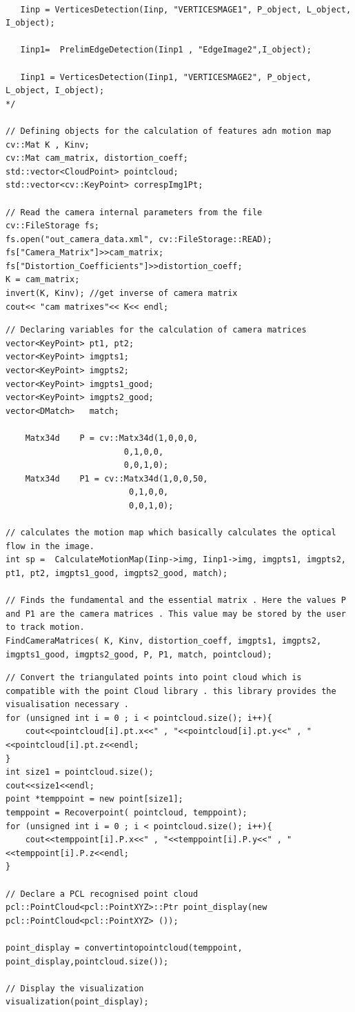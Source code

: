 \pagebreak
\begin{lstlisting}

   Iinp = VerticesDetection(Iinp, "VERTICESMAGE1", P_object, L_object, I_object);
 
   Iinp1=  PrelimEdgeDetection(Iinp1 , "EdgeImage2",I_object);

   Iinp1 = VerticesDetection(Iinp1, "VERTICESMAGE2", P_object, L_object, I_object);
*/

// Defining objects for the calculation of features adn motion map 
cv::Mat K , Kinv;
cv::Mat cam_matrix, distortion_coeff;
std::vector<CloudPoint> pointcloud;
std::vector<cv::KeyPoint> correspImg1Pt;

// Read the camera internal parameters from the file 
cv::FileStorage fs;
fs.open("out_camera_data.xml", cv::FileStorage::READ);
fs["Camera_Matrix"]>>cam_matrix;
fs["Distortion_Coefficients"]>>distortion_coeff;
K = cam_matrix;
invert(K, Kinv); //get inverse of camera matrix
cout<< "cam matrixes"<< K<< endl;
\end{lstlisting}
\pagebreak
\begin{lstlisting}
// Declaring variables for the calculation of camera matrices
vector<KeyPoint> pt1, pt2;
vector<KeyPoint> imgpts1;
vector<KeyPoint> imgpts2;
vector<KeyPoint> imgpts1_good;
vector<KeyPoint> imgpts2_good;
vector<DMatch>   match;

    Matx34d    P = cv::Matx34d(1,0,0,0,
						0,1,0,0,
						0,0,1,0);
	Matx34d    P1 = cv::Matx34d(1,0,0,50,
						 0,1,0,0,
						 0,0,1,0);

// calculates the motion map which basically calculates the optical flow in the image.
int sp =  CalculateMotionMap(Iinp->img, Iinp1->img, imgpts1, imgpts2, pt1, pt2, imgpts1_good, imgpts2_good, match);

// Finds the fundamental and the essential matrix . Here the values P and P1 are the camera matrices . This value may be stored by the user to track motion.
FindCameraMatrices( K, Kinv, distortion_coeff, imgpts1, imgpts2, imgpts1_good, imgpts2_good, P, P1, match, pointcloud);

\end{lstlisting}
\pagebreak
\begin{lstlisting}
// Convert the triangulated points into point cloud which is compatible with the point Cloud library . this library provides the visualisation necessary .
for (unsigned int i = 0 ; i < pointcloud.size(); i++){
    cout<<pointcloud[i].pt.x<<" , "<<pointcloud[i].pt.y<<" , "<<pointcloud[i].pt.z<<endl;
}
int size1 = pointcloud.size();
cout<<size1<<endl;
point *temppoint = new point[size1];
temppoint = Recoverpoint( pointcloud, temppoint);
for (unsigned int i = 0 ; i < pointcloud.size(); i++){
    cout<<temppoint[i].P.x<<" , "<<temppoint[i].P.y<<" , "<<temppoint[i].P.z<<endl;
}

// Declare a PCL recognised point cloud
pcl::PointCloud<pcl::PointXYZ>::Ptr point_display(new pcl::PointCloud<pcl::PointXYZ> ());

point_display = convertintopointcloud(temppoint, point_display,pointcloud.size());

// Display the visualization
visualization(point_display);
\end{lstlisting}
